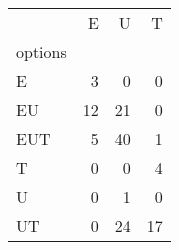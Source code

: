 \begin{tabular}{lrrr}
\toprule
{} &   E &   U &   T \\
options &     &     &     \\
\midrule
E       &   3 &   0 &   0 \\
EU      &  12 &  21 &   0 \\
EUT     &   5 &  40 &   1 \\
T       &   0 &   0 &   4 \\
U       &   0 &   1 &   0 \\
UT      &   0 &  24 &  17 \\
\bottomrule
\end{tabular}
